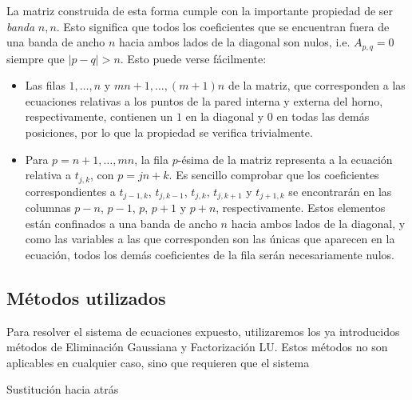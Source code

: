     La matriz construida de esta forma cumple con la importante propiedad de ser \emph{banda} $n, n$. Esto significa que todos los coeficientes que se encuentran fuera de una banda de ancho $n$ hacia ambos lados de la diagonal son nulos, i.e. $A_{p,q} = 0$ siempre que $\vert p - q \vert > n$. Esto puede verse fácilmente:

    \begin{itemize}
      \item Las filas $1, \dots, n$ y $mn + 1, \dots, (m+1)n$ de la matriz, que corresponden a las ecuaciones relativas a los puntos de la pared interna y externa del horno, respectivamente, contienen un $1$ en la diagonal y $0$ en todas las demás posiciones, por lo que la propiedad se verifica trivialmente.
      \item Para $p = n + 1, \dots, mn$, la fila $p$-ésima de la matriz representa a la ecuación relativa a $t_{j,k}$, con $p = jn+k$. Es sencillo comprobar que los coeficientes correspondientes a $t_{j-1,k}$, $t_{j,k-1}$, $t_{j,k}$, $t_{j,k+1}$ y $t_{j+1,k}$ se encontrarán en las columnas $p-n$, $p-1$, $p$, $p+1$ y $p+n$, respectivamente. Estos elementos están confinados a una banda de ancho $n$ hacia ambos lados de la diagonal, y como las variables a las que corresponden son las únicas que aparecen en la ecuación, todos los demás coeficientes de la fila serán necesariamente nulos.
    \end{itemize}

  \subsection{Métodos utilizados}

    Para resolver el sistema de ecuaciones expuesto, utilizaremos los ya introducidos métodos de Eliminación Gaussiana y Factorización LU. Estos métodos no son aplicables en cualquier caso, sino que requieren que el sistema


    \begin{algorithm}[H]
      \caption{Sustitución hacia atrás}
    \end{algorithm}

